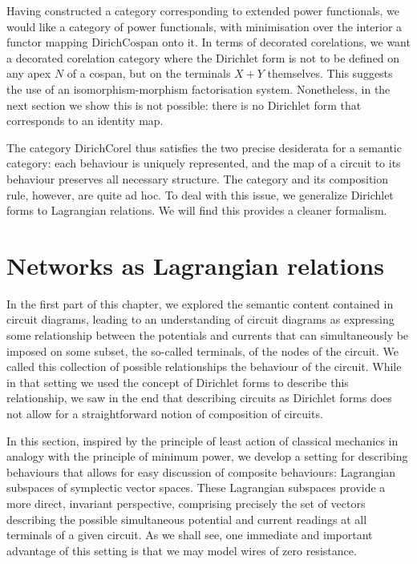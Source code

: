 Having constructed a category corresponding to extended power functionals, we
would like a category of power functionals, with minimisation over the interior
a functor mapping $\mathrm{DirichCospan}$ onto it. In terms of decorated
corelations, we want a decorated corelation category where the Dirichlet form is
not to be defined on any apex $N$ of a cospan, but on the terminals $X+Y$
themselves. This suggests the use of an isomorphism-morphism factorisation
system. Nonetheless, in the next section we show this is not possible: there is
no Dirichlet form that corresponds to an identity map.

The category $\mathrm{DirichCorel}$ thus satisfies the two precise desiderata
for a semantic category: each behaviour is uniquely represented, and the map of
a circuit to its behaviour preserves all necessary structure. The category and
its composition rule, however, are quite ad hoc. To deal with this issue, we
generalize Dirichlet forms to Lagrangian relations.  We will find this provides
a cleaner formalism.

\section{Networks as Lagrangian relations} \label{sec:circlagr}
In the first part of this chapter, we explored the semantic content contained in
circuit diagrams, leading to an understanding of circuit diagrams as expressing
some relationship between the potentials and currents that can simultaneously be
imposed on some subset, the so-called terminals, of the nodes of the circuit. We
called this collection of possible relationships the behaviour of the circuit.
While in that setting we used the concept of Dirichlet forms to describe this
relationship, we saw in the end that describing circuits as Dirichlet forms does
not allow for a straightforward notion of composition of circuits. 

In this section, inspired by the principle of least action of classical
mechanics in analogy with the principle of minimum power, we develop a setting
for describing behaviours that allows for easy discussion of composite
behaviours: Lagrangian subspaces of symplectic vector spaces. These Lagrangian
subspaces provide a more direct, invariant perspective, comprising precisely the
set of vectors describing the possible simultaneous potential and current
readings at all terminals of a given circuit. As we shall see, one immediate and
important advantage of this setting is that we may model wires of zero
resistance.

